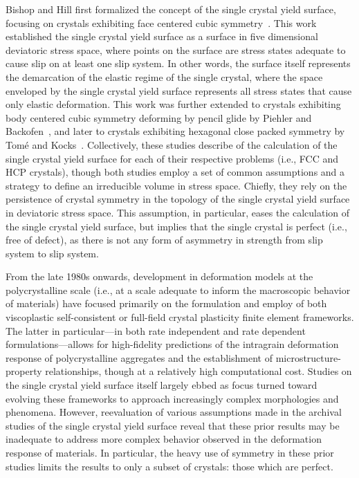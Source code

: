 \documentclass[preprint,3p,times,sort&compress,letterpaper,12pt]{elsarticle} %
\begin{document}
Bishop and Hill first formalized the concept of the single crystal yield surface, focusing on crystals exhibiting face centered cubic symmetry~\cite{Bishop1951}. This work established the single crystal yield surface as a surface in five dimensional deviatoric stress space, where points on the surface are stress states adequate to cause slip on at least one slip system. In other words, the surface itself represents the demarcation of the elastic regime of the single crystal, where the space enveloped by the single crystal yield surface represents all stress states that cause only elastic deformation. This work was further extended to crystals exhibiting body centered cubic symmetry deforming by pencil glide by Piehler and Backofen~\cite{Piehler1971}, and later to crystals exhibiting hexagonal close packed symmetry by Tom{\'e} and Kocks~\cite{Tome1985}. Collectively, these studies describe of the calculation of the single crystal yield surface for each of their respective problems (i.e., FCC and HCP crystals), though both studies employ a set of common assumptions and a strategy to define an irreducible volume in stress space. Chiefly, they rely on the persistence of crystal symmetry in the topology of the single crystal yield surface in deviatoric stress space. This assumption, in particular, eases the calculation of the single crystal yield surface, but implies that the single crystal is perfect (i.e., free of defect), as there is not any form of asymmetry in strength from slip system to slip system.

From the late 1980s onwards, development in deformation models at the polycrystalline scale (i.e., at a scale adequate to inform the macroscopic behavior of materials) have focused primarily on the formulation and employ of both viscoplastic self-consistent or full-field crystal plasticity finite element frameworks. The latter in particular---in both rate independent and rate dependent formulations---allows for high-fidelity predictions of the intragrain deformation response of polycrystalline aggregates and the establishment of microstructure-property relationships, though at a relatively high computational cost. Studies on the single crystal yield surface itself largely ebbed as focus turned toward evolving these frameworks to approach increasingly complex morphologies and phenomena. However, reevaluation of various assumptions made in the archival studies of the single crystal yield surface reveal that these prior results may be inadequate to address more complex behavior observed in the deformation response of materials. In particular, the heavy use of symmetry in these prior studies limits the results to only a subset of crystals: those which are perfect.
\end{document}
